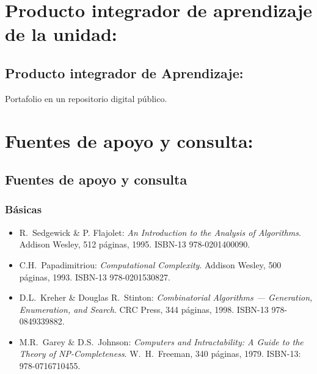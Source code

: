 \documentclass[10 pt]{article}
\begin{document}
\section{Producto integrador de aprendizaje de la unidad:}
\subsection{Producto integrador de Aprendizaje:} Portafolio en un repositorio digital p\'{u}blico.

\section{Fuentes de apoyo y consulta:}
\subsection{Fuentes de apoyo y consulta}
\subsubsection{B\'{a}sicas}

\begin{itemize}[itemsep=0em]
  
\item R.\ {\sc Sedgewick} \& P. {\sc Flajolet}: {\em An                                                                                                          
    Introduction to the Analysis of Algorithms}. Addison Wesley, 512
  p\'{a}ginas, 1995. ISBN-13 978-0201400090.
  
\item C.H.\ {\sc Papadimitriou}: {\em Computational                                                                                                               
     Complexity}. Addison Wesley, 500 p\'{a}ginas, 1993. ISBN-13
   978-0201530827.

 \item D.L.\ {\sc Kreher} \& Douglas R.\ {\sc Stinton}: {\em                                                                                                          
     Combinatorial Algorithms --- Generation, Enumeration, and                                                                                                            
     Search}. CRC Press, 344 p\'{a}ginas, 1998. ISBN-13 978-0849339882.

 \item M.R.\ {\sc Garey} \& D.S.\ {\sc Johnson}: {\em                                                                                                            
     Computers and Intractability: A Guide to the Theory of                                                                                                               
     NP-Completeness}. W.\ H.\ Freeman, 340 p\'{a}ginas, 1979. ISBN-13:
   978-0716710455.   
\end{itemize}
\end{document}
